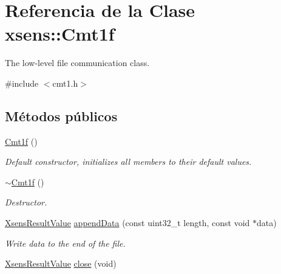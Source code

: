 \hypertarget{classxsens_1_1Cmt1f}{\section{\-Referencia de la \-Clase xsens\-:\-:\-Cmt1f}
\label{classxsens_1_1Cmt1f}
}


\-The low-\/level file communication class.  




{\ttfamily \#include $<$cmt1.\-h$>$}

\subsection*{\-Métodos públicos}
\begin{DoxyCompactItemize}
\item 
\hypertarget{classxsens_1_1Cmt1f_a919b42e4de22630c364ce79ff54d8989}{\hyperlink{classxsens_1_1Cmt1f_a919b42e4de22630c364ce79ff54d8989}{\-Cmt1f} ()}\label{classxsens_1_1Cmt1f_a919b42e4de22630c364ce79ff54d8989}

\begin{DoxyCompactList}\small\item\em \-Default constructor, initializes all members to their default values. \end{DoxyCompactList}\item 
\hypertarget{classxsens_1_1Cmt1f_a3f612d9d8c624b8f171a0661ce33ac2a}{\hyperlink{classxsens_1_1Cmt1f_a3f612d9d8c624b8f171a0661ce33ac2a}{$\sim$\-Cmt1f} ()}\label{classxsens_1_1Cmt1f_a3f612d9d8c624b8f171a0661ce33ac2a}

\begin{DoxyCompactList}\small\item\em \-Destructor. \end{DoxyCompactList}\item 
\hyperlink{group__enums_ga822a2260a20af524029eef9e9a51ff6f}{\-Xsens\-Result\-Value} \hyperlink{classxsens_1_1Cmt1f_a761759c365acf23f7e4159b5bedb1ae4}{append\-Data} (const uint32\-\_\-t length, const void $\ast$data)
\begin{DoxyCompactList}\small\item\em \-Write data to the end of the file. \end{DoxyCompactList}\item 
\hypertarget{classxsens_1_1Cmt1f_a998f005fb3832d4945e53a41b570d634}{\hyperlink{group__enums_ga822a2260a20af524029eef9e9a51ff6f}{\-Xsens\-Result\-Value} \hyperlink{classxsens_1_1Cmt1f_a998f005fb3832d4945e53a41b570d634}{close} (void)}\label{classxsens_1_1Cmt1f_a998f005fb3832d4945e53a41b570d634}


\end{DoxyCompactItemize}
